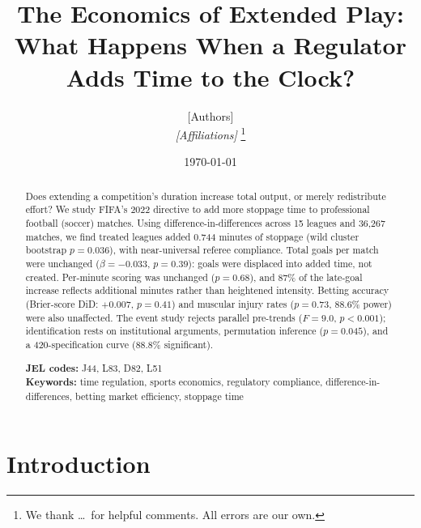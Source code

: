 \documentclass[12pt]{article}
\title{\textbf{The Economics of Extended Play: \\
What Happens When a Regulator Adds Time to the Clock?}}
\author{
  [Authors] \\[4pt]
  \textit{[Affiliations]}%
  \thanks{We thank \ldots\ for helpful comments. All errors are our own.}
}
\date{\today}
\begin{document}
\maketitle


\begin{abstract}
\noindent
Does extending a competition's duration increase total output, or merely redistribute effort? We study FIFA's 2022 directive to add more stoppage time to professional football (soccer) matches. Using difference-in-differences across 15 leagues and 36,267 matches, we find treated leagues added 0.744 minutes of stoppage (wild cluster bootstrap $p = 0.036$), with near-universal referee compliance. Total goals per match were unchanged ($\beta = -0.033$, $p = 0.39$): goals were displaced into added time, not created. Per-minute scoring was unchanged ($p = 0.68$), and 87\% of the late-goal increase reflects additional minutes rather than heightened intensity. Betting accuracy (Brier-score DiD: $+0.007$, $p = 0.41$) and muscular injury rates ($p = 0.73$, 88.6\% power) were also unaffected. The event study rejects parallel pre-trends ($F = 9.0$, $p < 0.001$); identification rests on institutional arguments, permutation inference ($p = 0.045$), and a 420-specification curve (88.8\% significant).

\medskip
\noindent
\textbf{JEL codes:} J44, L83, D82, L51 \\
\textbf{Keywords:} time regulation, sports economics, regulatory compliance, difference-in-differences, betting market efficiency, stoppage time
\end{abstract}

\newpage

\section{Introduction}
\label{sec:intro}
\end{document}
